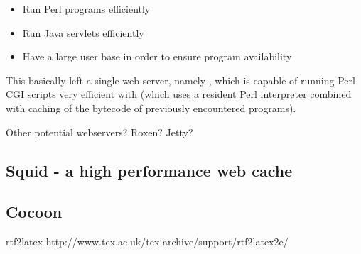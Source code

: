 \begin{itemize}
\item Run Perl programs efficiently
\item Run Java servlets efficiently
\item Have a large user base in order to ensure program availability
\end{itemize}

This basically left a single web-server, namely
, which is capable of running
Perl CGI scripts very efficient with
 (which
uses a resident Perl interpreter combined with caching of the bytecode
of previously encountered programs).

\textsf{Other potential webservers?  Roxen?  Jetty?}


\subsection{Squid - a high performance web cache}
\label{sec:squid}



\subsection{Cocoon}
\label{sec:cocoon}


rtf2latex http://www.tex.ac.uk/tex-archive/support/rtf2latex2e/



